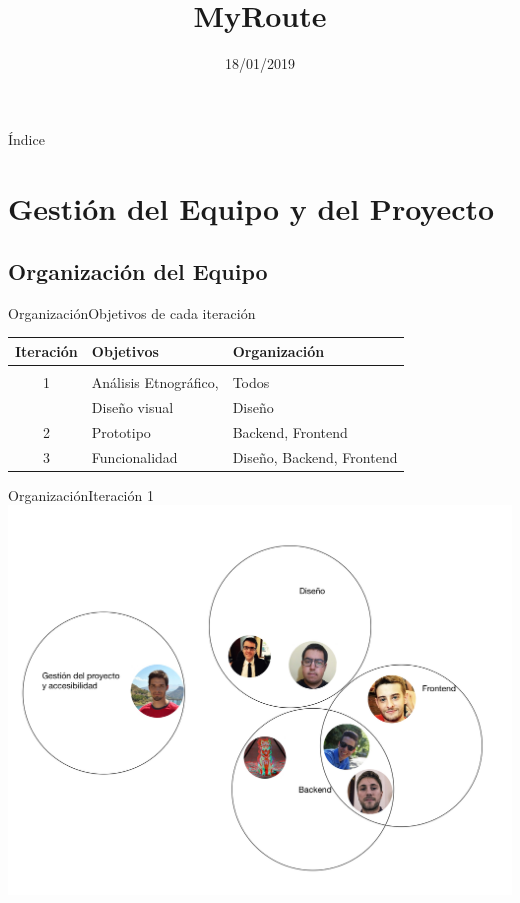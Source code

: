 \documentclass{beamer}
\title{MyRoute}
\date{18/01/2019}
\begin{document}
\begin{frame}
  \titlepage 
\end{frame}

\begin{frame}{\'Indice}
  \tiny 
  \tableofcontents
\end{frame}

\section{Gesti\'on del Equipo y del Proyecto}

\subsection{Organizaci\'on del Equipo}

\begin{frame}{Organizaci\'on}{Objetivos de cada iteraci\'on}
  \begin{tabular}{cll}
  Iteraci\'on  & Objetivos & Organizaci\'on \\\hline \\
  1  &  An\'alisis Etnogr\'afico,  & Todos \\
     &  Dise\~no visual            & Dise\~no\\[0.3cm]
  2  &  Prototipo  & Backend, Frontend \\[0.3cm]
  3  &  Funcionalidad & Dise\~no, Backend, Frontend
  \end{tabular}
\end{frame}


\begin{frame}{Organizaci\'on}{Iteraci\'on 1}
\includegraphics[scale=0.1]{images_latex/org_itr1}
\end{frame}
\end{document}
